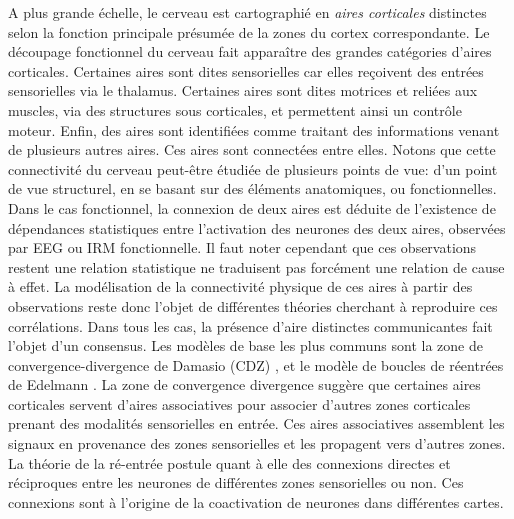 \documentclass[../main]{subfiles}
\begin{document}
A plus grande échelle, le cerveau est cartographié en \emph{aires corticales} distinctes selon la fonction principale présumée de la zones du cortex correspondante.
Le découpage fonctionnel du cerveau fait apparaître des grandes catégories d'aires corticales. Certaines aires sont dites sensorielles car elles reçoivent des entrées sensorielles via le thalamus. Certaines aires sont dites motrices et reliées aux muscles, via des structures sous corticales, et permettent ainsi un contrôle moteur.
Enfin, des aires sont identifiées comme traitant des informations venant de plusieurs autres aires.
Ces aires sont connectées entre elles. Notons que cette connectivité du cerveau peut-être étudiée de plusieurs points de vue: d'un point de vue structurel, en se basant sur des éléments anatomiques, ou fonctionnelles.
Dans le cas fonctionnel, la connexion de deux aires est déduite de l'existence de dépendances statistiques entre l'activation des neurones des deux aires, observées par EEG ou IRM fonctionnelle. Il faut noter cependant que ces observations restent une relation statistique ne traduisent pas forcément une relation de cause à effet. 
La modélisation de la connectivité physique de ces aires à partir des observations reste donc l'objet de différentes théories cherchant à reproduire ces corrélations. 
Dans tous les cas, la présence d'aire distinctes communicantes fait l'objet d'un consensus.
Les modèles de base les plus communs sont la zone de convergence-divergence de Damasio (CDZ) \cite{damasio_time-locked_1989}, et le modèle de boucles de réentrées de Edelmann \cite{Edelman1982GroupSA}.
La zone de convergence divergence suggère que certaines aires corticales servent d'aires associatives pour associer d'autres zones corticales prenant des modalités sensorielles en entrée. Ces aires associatives assemblent les signaux en provenance des zones sensorielles et les propagent vers d'autres zones. 
La théorie de la ré-entrée postule quant à elle des connexions directes et réciproques entre les neurones de différentes zones sensorielles ou non. Ces connexions sont à l'origine de la coactivation de neurones dans différentes cartes.
\end{document}
